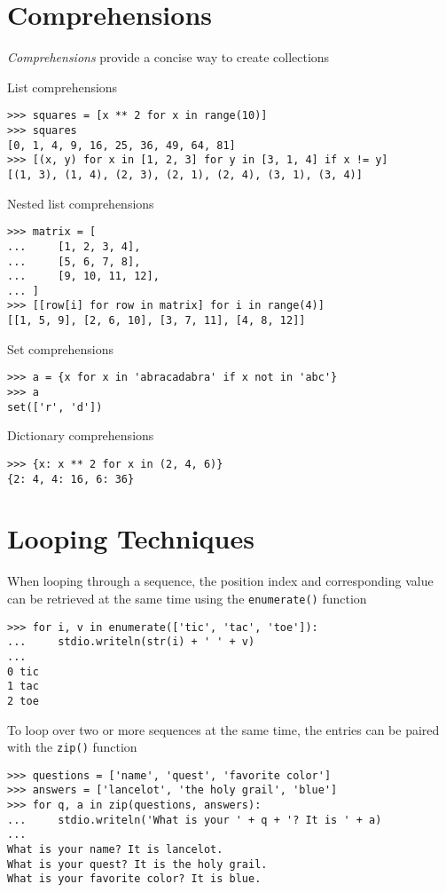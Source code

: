 \documentclass[8pt,a4paper,compress]{beamer}
\begin{document}
\section{Comprehensions}
\begin{frame}[fragile]
\emph{Comprehensions} provide a concise way to create collections

\bigskip

List comprehensions
\begin{lstlisting}[language={}]
>>> squares = [x ** 2 for x in range(10)]
>>> squares
[0, 1, 4, 9, 16, 25, 36, 49, 64, 81]
>>> [(x, y) for x in [1, 2, 3] for y in [3, 1, 4] if x != y]
[(1, 3), (1, 4), (2, 3), (2, 1), (2, 4), (3, 1), (3, 4)]
\end{lstlisting}

\bigskip

Nested list comprehensions
\begin{lstlisting}[language={}]
>>> matrix = [
...     [1, 2, 3, 4],
...     [5, 6, 7, 8],
...     [9, 10, 11, 12],
... ]
>>> [[row[i] for row in matrix] for i in range(4)]
[[1, 5, 9], [2, 6, 10], [3, 7, 11], [4, 8, 12]]
\end{lstlisting}

\bigskip

Set comprehensions
\begin{lstlisting}[language={}]
>>> a = {x for x in 'abracadabra' if x not in 'abc'}
>>> a
set(['r', 'd'])
\end{lstlisting}

\bigskip

Dictionary comprehensions
\begin{lstlisting}[language={}]
>>> {x: x ** 2 for x in (2, 4, 6)}
{2: 4, 4: 16, 6: 36}
\end{lstlisting}
\end{frame}

\section{Looping Techniques}
\begin{frame}[fragile]
When looping through a sequence, the position index and corresponding value can be retrieved at the same time using the \lstinline{enumerate()} function
\begin{lstlisting}[language={}]
>>> for i, v in enumerate(['tic', 'tac', 'toe']):
...     stdio.writeln(str(i) + ' ' + v)
...
0 tic
1 tac
2 toe
\end{lstlisting}

\bigskip

To loop over two or more sequences at the same time, the entries can be paired with the \lstinline{zip()} function
\begin{lstlisting}[language={}]
>>> questions = ['name', 'quest', 'favorite color']
>>> answers = ['lancelot', 'the holy grail', 'blue']
>>> for q, a in zip(questions, answers):
...     stdio.writeln('What is your ' + q + '? It is ' + a)
...
What is your name? It is lancelot.
What is your quest? It is the holy grail.
What is your favorite color? It is blue.
\end{lstlisting}
\end{frame}
\end{document}
